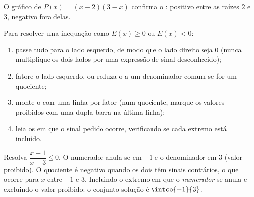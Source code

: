 \begin{omfigure}

{\small O gráfico de $P(x) = (x-2)(3-x)$ confirma o :
positivo entre as raízes $2$ e $3$, negativo fora delas.}
\end{omfigure}

\begin{method}\label{met:g10:algebra:signtable}
Para resolver uma inequação como $E(x) \geq 0$ ou $E(x) < 0$:
\begin{enumerate}
  \item passe tudo para o lado esquerdo, de modo que o lado direito seja
        $0$ (nunca multiplique os dois lados por uma expressão de sinal
        desconhecido);
  \item fatore o lado esquerdo, ou reduza-o a um denominador comum se for
        um quociente;
  \item monte o  com uma linha por fator (num quociente,
        marque os valores proibidos com uma dupla barra na última linha);
  \item leia os  em que o sinal pedido ocorre, verificando se
        cada extremo está incluído.
\end{enumerate}
\end{method}

\begin{example}\label{ex:g10:algebra:quotientineq}
Resolva $\dfrac{x + 1}{x - 3} \leq 0$. O numerador anula-se em $-1$ e o
denominador em $3$ (valor proibido). O quociente é negativo quando os
dois têm sinais contrários, o que ocorre para $x$ entre $-1$ e $3$.
Incluindo o extremo em que o \emph{numerador} se anula e excluindo o
valor proibido: o conjunto solução é $\intco{-1}{3}$.
\end{example}

